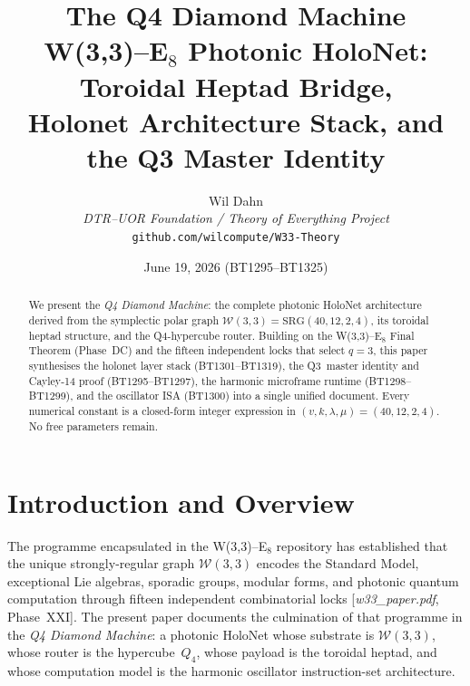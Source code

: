 \documentclass[12pt,a4paper]{article}
\title{%
  \textbf{The Q4 Diamond Machine}\\[6pt]
  \large W(3,3)--E$_8$ Photonic HoloNet: Toroidal Heptad Bridge,\\[2pt]
  Holonet Architecture Stack, and the Q3 Master Identity
}
\author{
  Wil Dahn\\[4pt]
  \textit{DTR--UOR Foundation / Theory of Everything Project}\\[2pt]
  \small\texttt{github.com/wilcompute/W33-Theory}
}
\date{June 19, 2026 \quad (BT1295--BT1325)}
\newcommand{\W}{\mathcal{W}(3,3)}
\begin{document}
\maketitle
\tableofcontents
\newpage

\begin{abstract}
We present the \emph{Q4 Diamond Machine}: the complete photonic HoloNet
architecture derived from the symplectic polar graph $\W =
\mathrm{SRG}(40,12,2,4)$, its toroidal heptad structure, and the
Q4-hypercube router. Building on the W(3,3)--E$_8$ Final Theorem (Phase~DC)
and the fifteen independent locks that select $q=3$, this paper synthesises
the holonet layer stack (BT1301--BT1319), the Q3~master identity and
Cayley-14 proof (BT1295--BT1297), the harmonic microframe runtime
(BT1298--BT1299), and the oscillator ISA (BT1300) into a single unified
document. Every numerical constant is a closed-form integer expression in
$(v,k,\lambda,\mu)=(40,12,2,4)$. No free parameters remain.
\end{abstract}

\section{Introduction and Overview}

The programme encapsulated in the W(3,3)--E$_8$ repository has established
that the unique strongly-regular graph $\W$ encodes the Standard Model,
exceptional Lie algebras, sporadic groups, modular forms, and photonic
quantum computation through fifteen independent combinatorial locks
[\textit{w33\_paper.pdf}, Phase~XXI]. The present paper documents the
culmination of that programme in the \emph{Q4 Diamond Machine}: a
photonic HoloNet whose substrate is $\W$, whose router is the
hypercube~$Q_4$, whose payload is the toroidal heptad, and whose
computation model is the harmonic oscillator instruction-set architecture.
\end{document}
